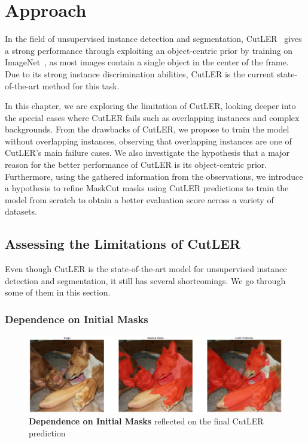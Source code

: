 \chapter{Approach}\label{chap:approach}

In the field of unsupervised instance detection and segmentation, CutLER~\cite{wang2023cut} gives a strong performance through exploiting an object-centric prior by training on ImageNet~\cite{deng2009imagenet}, as most images contain a single
object in the center of the frame.  Due to its strong instance discrimination abilities, CutLER is the current state-of-the-art method for this task.

In this chapter, we are exploring the limitation of CutLER, looking deeper into the special cases where CutLER fails such as overlapping instances and complex backgrounds. From the drawbacks of CutLER, we propose to train the model without overlapping instances, observing that overlapping instances are one of CutLER's main failure cases. We also investigate the hypothesis that a major reason for the better performance of CutLER is its object-centric prior. Furthermore, using the gathered information from the observations, we introduce a hypothesis to refine MaskCut masks using CutLER predictions to train the model from scratch to obtain a better evaluation score across a variety of datasets.

\section{Assessing the Limitations of CutLER}
Even though CutLER is the state-of-the-art model for unsupervised instance detection and segmentation, it still has several shortcomings. We go through some of them in this section.

\subsection{Dependence on Initial Masks}
\begin{figure}
	\centering
	\includegraphics[width=1\textwidth]{Images/main/cutler_problem_3.png}
	\caption[\textbf{Dependence on Initial Masks}]{\textbf{Dependence on Initial Masks} reflected on the final CutLER prediction}
	\label{fig:intial_mask_dependence}
\end{figure}

